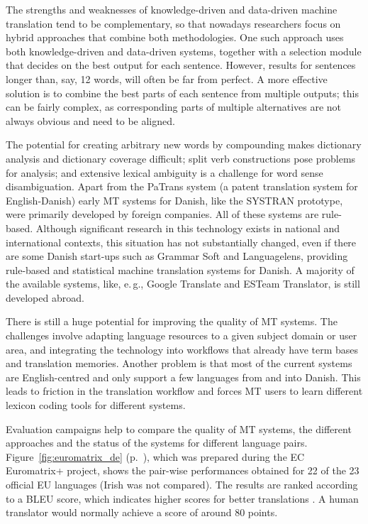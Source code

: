 \begin{multicols}{2}

The strengths and weaknesses of knowledge-driven and data-driven machine translation tend to be complementary, so that nowadays researchers focus on hybrid approaches that combine both methodologies. One such approach uses both knowledge-driven and data-driven systems, together with a selection module that decides on the best output for each sentence. However, results for sentences longer than, say, 12 words, will often be far from perfect. A more effective solution is to combine the best parts of each sentence from multiple outputs; this can be fairly complex, as corresponding parts of multiple alternatives are not always obvious and need to be aligned. 

The potential for creating arbitrary new words by compounding makes dictionary analysis and dictionary coverage difficult; split verb constructions pose problems for analysis; and extensive lexical ambiguity is a challenge for word sense disambiguation.
Apart from the PaTrans system (a patent translation system for English-Danish) early MT systems for Danish, like the SYSTRAN prototype, were primarily developed by foreign companies.
All of these systems are rule-based. Although significant research in this technology exists in national and international contexts, this situation has not substantially changed, even if there are some Danish start-ups such as Grammar Soft and Languagelens, providing rule-based and statistical machine translation systems for Danish. A majority of the available systems, like, e.\,g., Google Translate and ESTeam Translator, is still developed abroad.

There is still a huge potential for improving the quality of MT systems. The challenges involve adapting language resources to a given subject domain or user area, and integrating the technology into workflows that already have term bases and translation memories. Another problem is that most of the current systems are English-centred and only support a few languages from and into Danish. This leads to friction in the translation workflow and forces MT users to learn different lexicon coding tools for different systems.

Evaluation campaigns help to compare the quality of MT systems, the different approaches and the status of the systems for different language pairs. Figure~\ref{fig:euromatrix_de} (p.~\pageref{fig:euromatrix_de}), which was prepared during the EC Euromatrix+ project, shows the pair-wise performances obtained for 22 of the 23 official EU languages (Irish was not compared). The results are ranked according to a BLEU score, which indicates higher scores for better translations \cite{bleu1}. A human translator would normally achieve a score of around 80 points.


\end{multicols}
